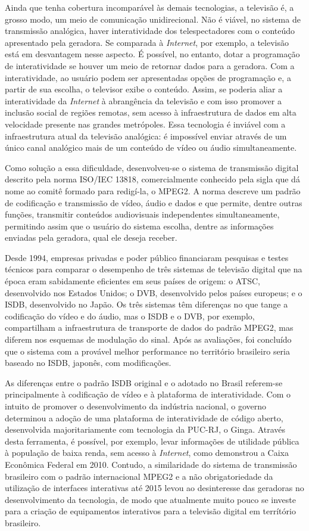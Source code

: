 \documentclass[
	12pt,				%
	openright,			%
	twoside,			%
	a4paper,			%
	english,			%
	french,				%
	brazil				%
	]{abntex2}
\begin{document}
Ainda que tenha cobertura incomparável às demais tecnologias, a televisão é, a grosso modo, um meio de comunicação
unidirecional. Não é viável, no sistema de transmissão analógica, haver interatividade dos
telespectadores com o conteúdo apresentado pela geradora. Se comparada à \textit{Internet}, por exemplo, a televisão
está em desvantagem nesse aspecto. É possível, no entanto, dotar a programação de interatividade se houver um meio de
retornar dados para a geradora. Com a interatividade, ao usuário podem ser apresentadas opções de programação e, 
a partir de sua escolha, o televisor exibe o conteúdo. Assim, se poderia aliar a interatividade da \textit{Internet}
à abrangência da televisão e com isso promover a inclusão social de regiões remotas, sem acesso à infraestrutura 
de dados em alta velocidade presente nas grandes metrópoles. Essa tecnologia é inviável com a infraestrutura atual
da televisão analógica: é impossível enviar através de um único canal analógico mais de um conteúdo de vídeo ou
áudio simultaneamente.

Como solução a essa dificuldade, desenvolveu-se
o sistema de transmissão digital descrito pela norma ISO/IEC 13818, comercialmente conhecido pela sigla que dá nome ao
comitê formado para redigí-la, o MPEG2. A norma descreve um padrão de codificação e transmissão de vídeo, áudio e dados
e que permite, dentre outras funções, transmitir conteúdos audiovisuais independentes simultaneamente, permitindo
assim que o usuário do sistema escolha, dentre as informações enviadas pela geradora, qual ele deseja receber.

Desde 1994, empresas privadas e poder público financiaram pesquisas e testes técnicos para comparar o desempenho de
três sistemas de televisão digital que na época eram sabidamente eficientes em seus países de origem: o ATSC,
desenvolvido nos Estados Unidos; o DVB, desenvolvido pelos países europeus; e o ISDB, desenvolvido no Japão. Os três
sistemas têm diferenças no que tange a codificação do vídeo e do áudio, mas o ISDB e o DVB, por exemplo, compartilham
a infraestrutura de transporte de dados do padrão MPEG2, mas diferem nos esquemas de modulação do sinal. Após as
avaliações, foi concluído que o sistema com a provável melhor performance no território brasileiro seria baseado
no ISDB, japonês, com modificações.

As diferenças entre o padrão ISDB original e o adotado no Brasil referem-se principalmente à codificação de vídeo e à
plataforma de interatividade. Com o intuito de promover o desenvolvimento da indústria nacional, o governo determinou a adoção de uma
plataforma de interatividade de código aberto, desenvolvida majoritariamente com tecnologia da PUC-RJ, o Ginga.
Através desta ferramenta, é possível, por exemplo, levar informações de utilidade pública à população de baixa renda, sem acesso
à \textit{Internet}, como demonstrou a Caixa Econômica Federal em 2010.
Contudo, a similaridade do sistema de transmissão brasileiro com o padrão internacional MPEG2 e a não
obrigatoriedade da utilização de interfaces interativas até 2015 levou ao desinteresse das geradoras no desenvolvimento da tecnologia,
de modo que atualmente muito pouco se investe para a criação de equipamentos interativos para a televisão digital em terrítório
brasileiro.
\end{document}
